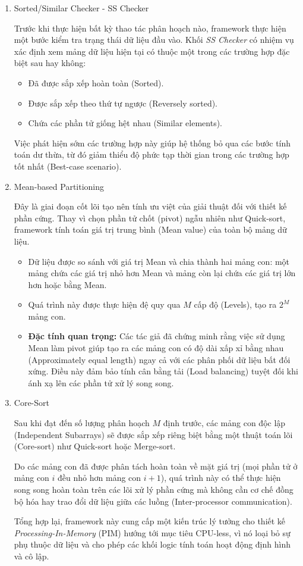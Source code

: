 \begin{enumerate}[label=\textbf{Phase \arabic*.}, leftmargin=1.5cm]
	\item Sorted/Similar Checker - SS Checker
	
	Trước khi thực hiện bất kỳ thao tác phân hoạch nào, framework thực hiện một bước kiểm tra trạng thái dữ liệu đầu vào. Khối \textit{SS Checker} có nhiệm vụ xác định xem mảng dữ liệu hiện tại có thuộc một trong các trường hợp đặc biệt sau hay không:
	\begin{itemize}
		\item Đã được sắp xếp hoàn toàn (Sorted).
		\item Được sắp xếp theo thứ tự ngược (Reversely sorted).
		\item Chứa các phần tử giống hệt nhau (Similar elements).
	\end{itemize}
	Việc phát hiện sớm các trường hợp này giúp hệ thống bỏ qua các bước tính toán dư thừa, từ đó giảm thiểu độ phức tạp thời gian trong các trường hợp tốt nhất (Best-case scenario).
	
	\item Mean-based Partitioning
		
	Đây là giai đoạn cốt lõi tạo nên tính ưu việt của giải thuật đối với thiết kế phần cứng. Thay vì chọn phần tử chốt (pivot) ngẫu nhiên như Quick-sort, framework tính toán giá trị trung bình (Mean value) của toàn bộ mảng dữ liệu.
	\begin{itemize}
		\item Dữ liệu được so sánh với giá trị Mean và chia thành hai mảng con: một mảng chứa các giá trị nhỏ hơn Mean và mảng còn lại chứa các giá trị lớn hơn hoặc bằng Mean.
		\item Quá trình này được thực hiện đệ quy qua $M$ cấp độ (Levels), tạo ra $2^M$ mảng con.
		\item \textbf{Đặc tính quan trọng:} Các tác giả đã chứng minh rằng việc sử dụng Mean làm pivot giúp tạo ra các mảng con có độ dài xấp xỉ bằng nhau (Approximately equal length) ngay cả với các phân phối dữ liệu bất đối xứng. Điều này đảm bảo tính cân bằng tải (Load balancing) tuyệt đối khi ánh xạ lên các phần tử xử lý song song.
	\end{itemize}
	
	\item Core-Sort
	
	Sau khi đạt đến số lượng phân hoạch $M$ định trước, các mảng con độc lập (Independent Subarrays) sẽ được sắp xếp riêng biệt bằng một thuật toán lõi (Core-sort) như Quick-sort hoặc Merge-sort. 
	
	Do các mảng con đã được phân tách hoàn toàn về mặt giá trị (mọi phần tử ở mảng con $i$ đều nhỏ hơn mảng con $i+1$), quá trình này có thể thực hiện song song hoàn toàn trên các lõi xử lý phần cứng mà không cần cơ chế đồng bộ hóa hay trao đổi dữ liệu giữa các luồng (Inter-processor communication).
	
	Tổng hợp lại, framework này cung cấp một kiến trúc lý tưởng cho thiết kế \textit{Processing-In-Memory} (PIM) hướng tới mục tiêu CPU-less, vì nó loại bỏ sự phụ thuộc dữ liệu và cho phép các khối logic tính toán hoạt động định hình và cô lập.
\end{enumerate}

